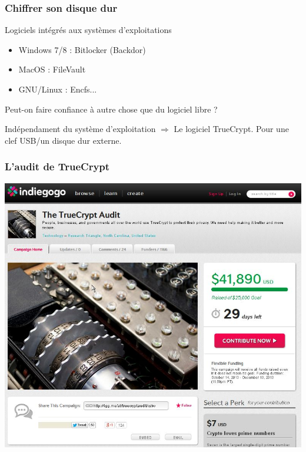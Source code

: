 \begin{frame}

\frametitle{Chiffrer son disque dur}
\begin{block}{Logiciels intégrés aux systèmes d'exploitations}
\begin{itemize}
\item Windows 7/8 : Bitlocker (Backdor)
\item MacOS : FileVault
\item GNU/Linux : Encfs...
\end{itemize}
Peut-on faire confiance à autre chose que du logiciel libre ?
\end{block}

\begin{block}{Indépendament du système d'exploitation}
$\Rightarrow$ Le logiciel TrueCrypt. Pour une clef USB/un disque dur externe.
\end{block}
\end{frame}

\begin{frame}
\frametitle{L'audit de TrueCrypt}
\begin{center}
 \includegraphics[scale=0.45] {./materials/truecryptaudit.jpg} 
\end{center}
\end{frame}
